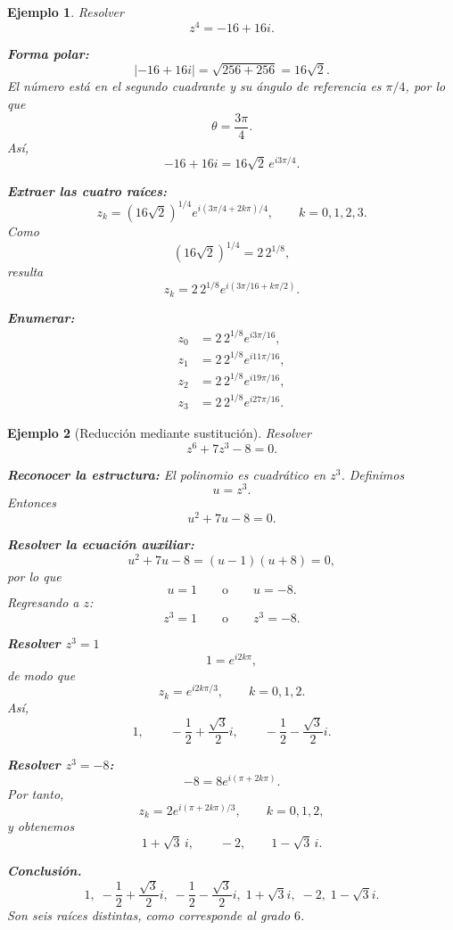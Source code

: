 \documentclass[12pt]{article}
\newtheorem{ejemplo}{Ejemplo}[section]
\begin{document}
\begin{ejemplo}
Resolver
\[
z^4=-16+16i.
\]

\textbf{Forma polar:}
\[
|-16+16i|=\sqrt{256+256}=16\sqrt2.
\]
El número está en el segundo cuadrante y su ángulo de referencia es $\pi/4$,
por lo que
\[
\theta=\frac{3\pi}{4}.
\]
Así,
\[
-16+16i=16\sqrt2\,e^{i3\pi/4}.
\]

\textbf{Extraer las cuatro raíces:}
\[
z_k=(16\sqrt2)^{1/4}
e^{i(3\pi/4+2k\pi)/4},
\qquad k=0,1,2,3.
\]
Como
\[
(16\sqrt2)^{1/4}=2\,2^{1/8},
\]
resulta
\[
z_k=2\,2^{1/8}e^{i(3\pi/16+k\pi/2)}.
\]

\textbf{Enumerar:}
\[
\boxed{
\begin{aligned}
z_0&=2\,2^{1/8}e^{i3\pi/16},\\
z_1&=2\,2^{1/8}e^{i11\pi/16},\\
z_2&=2\,2^{1/8}e^{i19\pi/16},\\
z_3&=2\,2^{1/8}e^{i27\pi/16}.
\end{aligned}}
\]
\end{ejemplo}

\begin{ejemplo}[Reducción mediante sustitución]
Resolver
\[
z^6+7z^3-8=0.
\]

\textbf{Reconocer la estructura:}
El polinomio es cuadrático en $z^3$. Definimos
\[
u=z^3.
\]
Entonces
\[
u^2+7u-8=0.
\]

\textbf{Resolver la ecuación auxiliar:}
\[
u^2+7u-8=(u-1)(u+8)=0,
\]
por lo que
\[
u=1\qquad\text{o}\qquad u=-8.
\]
Regresando a $z$:
\[
z^3=1
\qquad\text{o}\qquad
z^3=-8.
\]

\textbf{Resolver $z^3=1$}
\[
1=e^{i2k\pi},
\]
de modo que
\[
z_k=e^{i2k\pi/3},\qquad k=0,1,2.
\]
Así,
\[
1,\qquad
-\frac12+\frac{\sqrt3}{2}i,\qquad
-\frac12-\frac{\sqrt3}{2}i.
\]

\textbf{Resolver $z^3=-8$:}
\[
-8=8e^{i(\pi+2k\pi)}.
\]
Por tanto,
\[
z_k=2e^{i(\pi+2k\pi)/3},\qquad k=0,1,2,
\]
y obtenemos
\[
1+\sqrt3\,i,\qquad -2,\qquad 1-\sqrt3\,i.
\]

\textbf{Conclusión.}
\[
\boxed{
1,\;
-\frac12+\frac{\sqrt3}{2}i,\;
-\frac12-\frac{\sqrt3}{2}i,\;
1+\sqrt3 i,\;
-2,\;
1-\sqrt3 i.
}
\]
Son seis raíces distintas, como corresponde al grado $6$.
\end{ejemplo}
\end{document}

